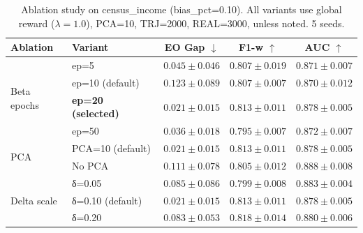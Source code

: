 \begin{table}[t]
\centering
\caption{Ablation study on census\_income (bias\_pct=0.10). All variants use global reward ($\lambda{=}1.0$), PCA=10, TRJ=2000, REAL=3000, unless noted. 5 seeds.}
\label{tab:ablation}
\begin{tabular}{llccc}
\hline
Ablation & Variant & EO Gap $\downarrow$ & F1-w $\uparrow$ & AUC $\uparrow$ \\
\hline
    \multirow{4}{*}{Beta epochs} & ep=5 & $0.045\pm0.046$ & $0.807\pm0.019$ & $0.871\pm0.007$ \\
     & ep=10 (default) & $0.123\pm0.089$ & $0.807\pm0.007$ & $0.870\pm0.012$ \\
     & \textbf{ep=20 (selected)} & \textbf{$0.021\pm0.015$} & \textbf{$0.813\pm0.011$} & \textbf{$0.878\pm0.005$} \\
     & ep=50 & $0.036\pm0.018$ & $0.795\pm0.007$ & $0.872\pm0.007$ \\
    \hline
    \multirow{2}{*}{PCA} & PCA=10 (default) & $0.021\pm0.015$ & $0.813\pm0.011$ & $0.878\pm0.005$ \\
     & No PCA & $0.111\pm0.078$ & $0.805\pm0.012$ & $0.888\pm0.008$ \\
    \hline
    \multirow{3}{*}{Delta scale} & δ=0.05 & $0.085\pm0.086$ & $0.799\pm0.008$ & $0.883\pm0.004$ \\
     & δ=0.10 (default) & $0.021\pm0.015$ & $0.813\pm0.011$ & $0.878\pm0.005$ \\
     & δ=0.20 & $0.083\pm0.053$ & $0.818\pm0.014$ & $0.880\pm0.006$ \\
\hline
\end{tabular}
\end{table}